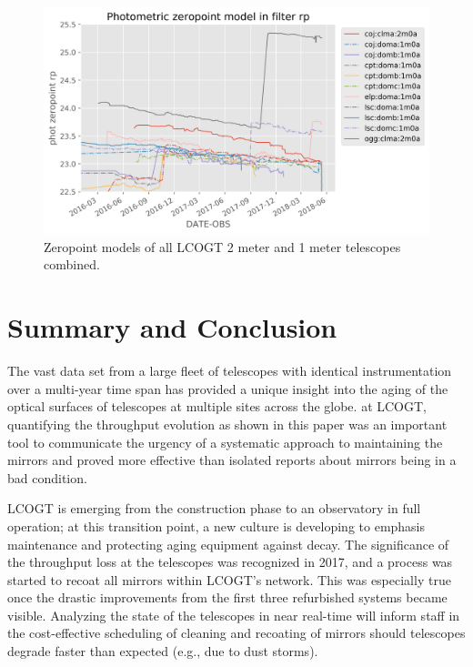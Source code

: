 \documentclass[]{spieman}
\begin{document}
\begin{figure}
\includegraphics[width=\textwidth]{images/allmodels__2m0a_1m0a__rp.png}
\caption{\label{fig_alltelescopes} Zeropoint models of all LCOGT 2 meter and 1 meter telescopes combined. }
\end{figure}






\section{Summary and Conclusion}

The vast data set from a large fleet of telescopes with identical instrumentation over a multi-year
time span has provided a unique insight into the aging of the optical surfaces of telescopes at
multiple sites across the globe. at LCOGT, quantifying the throughput evolution as shown in this
paper was an important tool to communicate the urgency of a systematic approach to maintaining the
mirrors and proved more effective than isolated reports about mirrors being in a bad condition.

LCOGT is emerging from the construction phase to an observatory in full operation; at this
transition point, a new culture is developing to emphasis maintenance and protecting aging equipment
against decay. The significance of the throughput loss at the telescopes was recognized in 2017, and
a process was started to recoat all mirrors within LCOGT's network.  This was especially true once
the drastic improvements from the first three refurbished systems became visible.  Analyzing the
state of the telescopes in near real-time will inform staff in the cost-effective scheduling of
cleaning and recoating of mirrors should telescopes degrade faster than expected (e.g., due to dust
storms).
\end{document}
